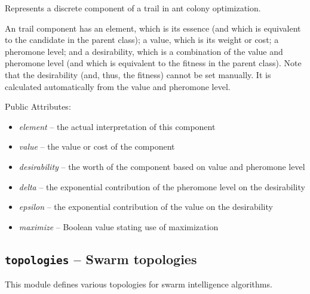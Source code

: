 \documentclass[letterpaper,10pt,english]{sphinxmanual}
\begin{document}
\begin{fulllineitems}
\label{reference:inspyred.swarm.TrailComponent}
Represents a discrete component of a trail in ant colony optimization.

An trail component has an element, which is its essence (and which
is equivalent to the candidate in the  parent class); 
a value, which is its weight or cost; a pheromone level; and a
desirability, which is a combination of the value and pheromone
level (and which is equivalent to the fitness in the 
parent class). Note that the desirability (and, thus, the fitness)
cannot be set manually. It is calculated automatically from the 
value and pheromone level.

Public Attributes:
\begin{itemize}
\item {} 
\emph{element} -- the actual interpretation of this component

\item {} 
\emph{value} -- the value or cost of the component

\item {} 
\emph{desirability} -- the worth of the component based on value and 
pheromone level

\item {} 
\emph{delta} -- the exponential contribution of the pheromone level on
the desirability

\item {} 
\emph{epsilon} -- the exponential contribution of the value on the 
desirability

\item {} 
\emph{maximize} -- Boolean value stating use of maximization

\end{itemize}

\end{fulllineitems}

\label{reference:module-inspyred.swarm.topologies}

\subsection{\texttt{topologies} -- Swarm topologies}
\label{reference:topologies-swarm-topologies}
This module defines various topologies for swarm intelligence algorithms.
\end{document}
